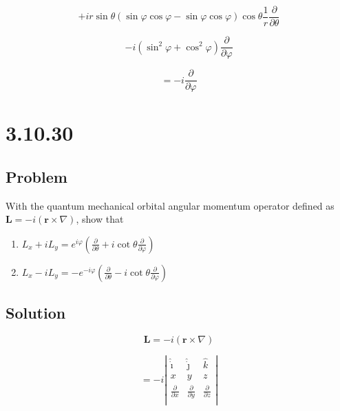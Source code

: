 \documentclass[12pt]{article}
\begin{document}
\[
    + i r \sin{\theta}
    \left(\sin{\varphi} \cos{\varphi} - \sin{\varphi} \cos{\varphi}\right)
    \cos{\theta} \frac{1}{r} \frac{\partial}{\partial \theta}
\]

\[
    - i \left(\sin^2{\varphi} + \cos^2{\varphi} \right) \frac{\partial}{\partial \varphi}
\]

\[
    = - i \frac{\partial}{\partial \varphi}
\]

\section{3.10.30}

\subsection{Problem}

With the quantum mechanical orbital angular momentum operator defined as
\(\textbf{L} = -i \left(\textbf{r} \times \nabla\right)\), show that
\bigskip

\begin{enumerate}[label= \textbf{(\alph*)}]
    \item
          \(
          L_x + i L_y = e^{i \varphi}
          \left(
          \frac{\partial}{\partial \theta}
          + i \cot{\theta}\frac{\partial}{\partial \varphi}
          \right)
          \)

    \item
          \(
          L_x - i L_y = - e^{- i \varphi}
          \left(
          \frac{\partial}{\partial \theta}
          - i \cot{\theta}\frac{\partial}{\partial \varphi}
          \right)
          \)
\end{enumerate}
\bigskip

\subsection{Solution}

\[
    \textbf{L} = -i \left(\textbf{r} \times \nabla\right)
\]

\[
    = -i \left\lvert \begin{array}{ccc}
        \hat{\dot{\imath}}          & \hat{\dot{\jmath}}          & \hat{k}                     \\
        x                           & y                           & z                           \\
        \frac{\partial}{\partial x} & \frac{\partial}{\partial y} & \frac{\partial}{\partial z} \\
    \end{array} \right\rvert
\]
\end{document}
